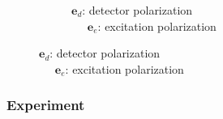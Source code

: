 \documentclass{beamer}
\theoremstyle{definition}
\begin{document}
\begin{frame}
\begin{figure}[!htb]
\begin{subfigure}{0.49\textwidth}
		\caption{$\mathbf{e}_d$: detector polarization\\
		$\hspace{17pt}\mathbf{e}_e$: excitation polarization}
	\end{subfigure}
\end{figure}



\end{frame}













\begin{frame}
\frametitle{Experiment}





\end{frame}
\end{document}
